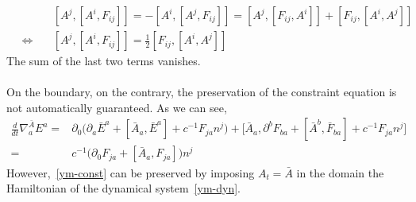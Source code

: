 \begin{equation}
\begin{split}
&[A^j, [A^i, F_{ij}]] = - [A^i, [A^j, F_{ij}]]
= [A^j, [F_{ij}, A^i]] + [F_{ij}, [A^i, A^j]] \\
 \quad\Leftrightarrow\quad &
[A^j, [A^i, F_{ij}]] = \frac 1 2 [F_{ij}, [A^i, A^j]]
\end{split}
\end{equation}
The sum of the last two terms vanishes. \\\\
On the boundary, on the contrary, the preservation of the constraint equation is not automatically guaranteed. As we can see,
\begin{equation*}
\begin{split}
\frac{d}{dt}\nabla^{\bar A}_a E^a = & 
\partial_0\big(\partial_a \bar{E}^a + [\bar{A}_a, \bar{E}^a] + c^{-1} F_{j a} n^j\big) + 
\big[\bar{A}_a, \partial^b F_{ba} + [\bar{A}^b, \bar{F}_{ba}] + c^{-1} F_{j a} n^j\big] \\
%
= & c^{-1}\big(\partial_0 F_{ja}+ [\bar{A}_a, F_{ja}]\big) n^j
\end{split}
\end{equation*}
However,~\cref{ym-const} can be preserved by imposing $A_t = \bar A$ in the domain the Hamiltonian of the dynamical system~\cref{ym-dyn}.



















